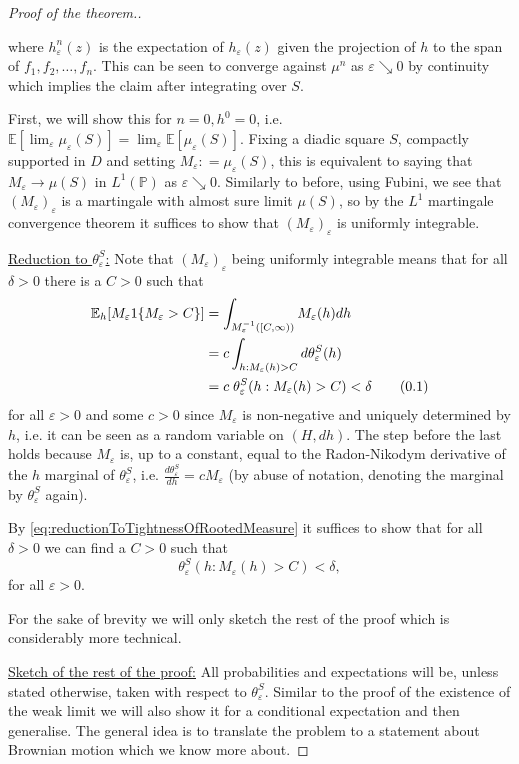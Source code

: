 \documentclass[11pt,reqno]{amsart}
\numberwithin{equation}{section}
\newcommand{\deq}{\mathrel{\mathop:}=}
\newcommand\numberthis{\addtocounter{equation}{1}\tag{\theequation}} %
\renewcommand\theequation{{\thesection}%
                   .{\arabic{equation}}}
\newcommand{\eps}{\varepsilon}
\begin{document}
\begin{proof}[Proof of the theorem.]
\begin{itemize}
			where $h^n_\eps(z)$ is the expectation of $h_\eps(z)$ given the projection of $h$ to the span of $f_1,f_2,\dots,f_n$. This can be seen to converge against $\mu^n$ as $\eps\searrow 0$ by continuity which implies the claim after integrating over $S$.
	\end{itemize}
	First, we will show this for $n=0, h^0=0$, i.e. $\mathbb E[\lim_\eps\mu_\eps(S)]=\lim_\eps\mathbb E[\mu_\eps(S)]$. Fixing a diadic square $S$, compactly supported in $D$ and setting $M_\eps\deq \mu_\eps(S)$, this is equivalent to saying that $M_\eps\rightarrow \mu(S)$ in $L^1(\mathbb P)$ as $\eps\searrow 0$. Similarly to before, using Fubini, we see that $(M_\eps)_\eps$ is a martingale with almost sure limit $\mu(S)$, so by the $L^1$ martingale convergence theorem it suffices to show that $(M_\eps)_\eps$ is uniformly integrable.
	
	\underline{Reduction to $\theta_\eps^S$:} Note that $(M_\eps)_\eps$ being uniformly integrable means that for all $\delta>0$ there is a $C>0$ such that 
	\begin{align*}
		\mathbb E_h[M_\eps 1\{M_\eps>C\}]
		&= \int_{M_\eps^{-1}([C,\infty))}M_\eps(h)dh\\
		&= c\int_{h:M_\eps(h)>C} d\theta_\eps^S(h)\\
		&= c\;\theta_\eps^S(h:M_\eps(h)>C)<\delta\numberthis\label{eq:reductionToTightnessOfRootedMeasure}
	\end{align*} for all $\eps>0$ and some $c>0$ since $M_\eps$ is non-negative and uniquely determined by $h$, i.e. it can be seen as a random variable on $(H, dh)$.
	The step before the last holds because $M_\eps$ is, up to a constant, equal to the Radon-Nikodym derivative of the $h$ marginal of $\theta^S_\eps$, i.e. $\frac{d\theta^S_\eps}{dh}=cM_\eps$ (by abuse of notation, denoting the marginal by $\theta^S_\eps$ again).
	
	By \eqref{eq:reductionToTightnessOfRootedMeasure} it suffices to show that for all $\delta>0$ we can find a $C>0$ such that \begin{equation}\label{eq:thetaTightness}
			\theta_\eps^S(h:M_\eps(h)>C)<\delta,
		\end{equation} for all $\eps>0$.
	
	For the sake of brevity we will only sketch the rest of the proof which is considerably more technical.
	
	\underline{Sketch of the rest of the proof:} All probabilities and expectations will be, unless stated otherwise, taken with respect to $\theta_\eps^S$. Similar to the proof of the existence of the weak limit we will also show it for a conditional expectation and then generalise. The general idea is to translate the problem to a statement about Brownian motion which we know more about.
	

\end{proof}
\end{document}
